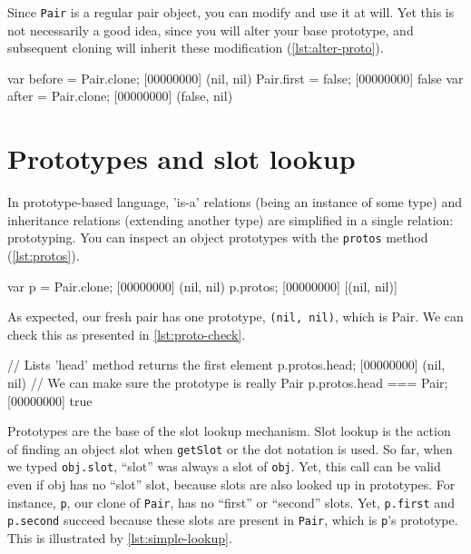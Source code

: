 Since \lstinline|Pair| is a regular pair object, you can modify and
use it at will. Yet this is not necessarily a good idea, since you
will alter your base prototype, and subsequent cloning will inherit
these modification (\autoref{lst:alter-proto}).

\begin{urbiscript}[caption=Altering a prototype, label=lst:alter-proto]
var before = Pair.clone;
[00000000] (nil, nil)
Pair.first = false;
[00000000] false
var after = Pair.clone;
[00000000] (false, nil)
\end{urbiscript}

\section{Prototypes and slot lookup}

In prototype-based language, 'is-a' relations (being an instance of
some type) and inheritance relations (extending another type) are
simplified in a single relation: prototyping. You can inspect an
object prototypes with the \texttt{protos} method (\autoref{lst:protos}).

\begin{urbiscript}[caption=Inspecting prototypes, label=lst:protos,
  name=protos]
var p = Pair.clone;
[00000000] (nil, nil)
p.protos;
[00000000] [(nil, nil)]
\end{urbiscript}

As expected, our fresh pair has one prototype, \lstinline|(nil, nil)|,
which is Pair. We can check this as presented in \autoref{lst:proto-check}.

\begin{urbiscript}[caption=Checking the prototype,
  label=lst:proto-check, name=protos]
// Lists 'head' method returns the first element
p.protos.head;
[00000000] (nil, nil)
// We can make sure the prototype is really Pair
p.protos.head === Pair;
[00000000] true
\end{urbiscript}

Prototypes are the base of the slot lookup mechanism. Slot lookup is
the action of finding an object slot when \texttt{getSlot} or the dot
notation is used. So far, when we typed \lstinline|obj.slot|, ``slot''
was always a slot of \lstinline|obj|.
Yet, this call can be valid even if obj has
no ``slot'' slot, because slots are also looked up in prototypes. For
instance, \lstinline|p|, our clone of \lstinline|Pair|, has no
``first'' or ``second'' slots. Yet, \lstinline|p.first| and
\lstinline|p.second| succeed because these slots are present in
\lstinline|Pair|, which is \lstinline|p|'s prototype. This is
illustrated by \autoref{lst:simple-lookup}.

